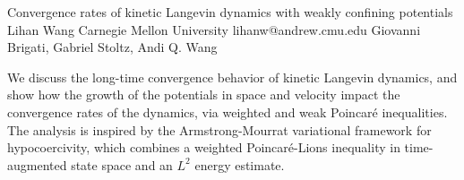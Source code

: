 \begin{talk}
  {Convergence rates of kinetic Langevin dynamics with weakly confining potentials}%
  {Lihan Wang}%
  {Carnegie Mellon University}%
  {lihanw@andrew.cmu.edu}%
  {Giovanni Brigati, Gabriel Stoltz, Andi Q. Wang}%
  
    
   
We discuss the long-time convergence behavior of kinetic Langevin dynamics, and show how the growth of the potentials in space and velocity impact the convergence rates of the dynamics, via weighted and weak Poincar\'e inequalities. The analysis is inspired by the Armstrong-Mourrat variational framework for hypocoercivity, which combines a weighted Poincar\'e-Lions inequality in time-augmented state space and an $L^2$ energy estimate.


\end{talk}

